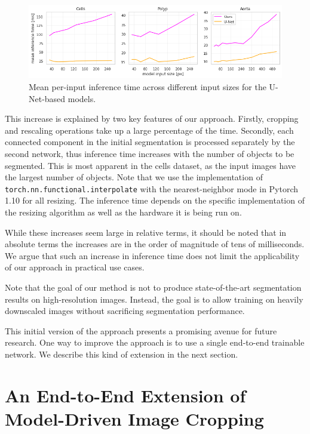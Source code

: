 \begin{figure}[b!]
\centering
\includegraphics[width=\textwidth]{images/5/inf_time.png}
\caption{Mean per-input inference time across different input sizes for the U-Net-based models. \cite{bencevicSegmentthenSegmentContextPreservingCropBased2023a}\label{fig:inf-time}}
\end{figure}

This increase is explained by two key features of our approach. Firstly, cropping and rescaling operations take up a large percentage of the time. Secondly, each connected component in the initial segmentation is processed separately by the second network, thus inference time increases with the number of objects to be segmented. This is most apparent in the cells dataset, as the input images have the largest number of objects. Note that we use the implementation of \verb|torch.nn.functional.interpolate| with the nearest-neighbor mode in Pytorch 1.10 for all resizing. The inference time depends on the specific implementation of the resizing algorithm as well as the hardware it is being run on.

While these increases seem large in relative terms, it should be noted that in absolute terms the increases are in the order of magnitude of tens of milliseconds. We argue that such an increase in inference time does not limit the applicability of our approach in practical use cases.

Note that the goal of our method is not to produce state-of-the-art segmentation results on high-resolution images. Instead, the goal is to allow training on heavily downscaled images without sacrificing segmentation performance.

This initial version of the approach presents a promising avenue for future research. One way to improve the approach is to use a single end-to-end trainable network. We describe this kind of extension in the next section.

\section{An End-to-End Extension of Model-Driven Image Cropping}

